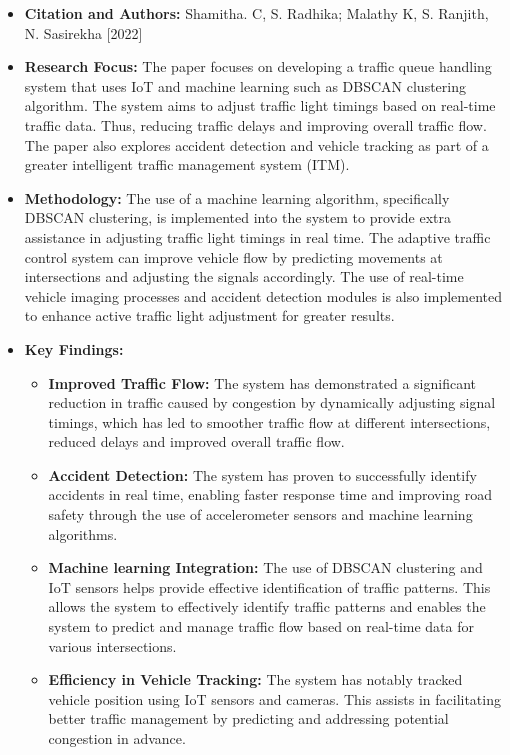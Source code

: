 \documentclass[12pt,a4paper]{article}
\begin{document}
\begin{itemize}
    \begin{itemize}
        \item \textbf{Citation and Authors:} Shamitha. C, S. Radhika; Malathy K, S. Ranjith, N. Sasirekha [2022] 
        \item \textbf{Research Focus:} The paper focuses on developing a traffic queue handling system that uses IoT and machine learning such as DBSCAN clustering algorithm. The system aims to adjust traffic light timings based on real-time traffic data. Thus, reducing traffic delays and improving overall traffic flow. The paper also explores accident detection and vehicle tracking as part of a greater intelligent traffic management system (ITM).
        \item \textbf{Methodology:} The use of a machine learning algorithm, specifically DBSCAN clustering, is implemented into the system to provide extra assistance in adjusting traffic light timings in real time. The adaptive traffic control system can improve vehicle flow by predicting movements at intersections and adjusting the signals accordingly. The use of real-time vehicle imaging processes and accident detection modules is also implemented to enhance active traffic light adjustment for greater results.
        \item \textbf{Key Findings:} 
        \begin{itemize}
            \item \textbf{Improved Traffic Flow:} The system has demonstrated a significant reduction in traffic caused by congestion by dynamically adjusting signal timings, which has led to smoother traffic flow at different intersections, reduced delays and improved overall traffic flow.
            \item \textbf{Accident Detection:} The system has proven to successfully identify accidents in real time, enabling faster response time and improving road safety through the use of accelerometer sensors and machine learning algorithms.
            \item \textbf{Machine learning Integration:} The use of DBSCAN clustering and IoT sensors helps provide effective identification of traffic patterns. This allows the system to effectively identify traffic patterns and enables the system to predict and manage traffic flow based on real-time data for various intersections. 
            \item \textbf{Efficiency in Vehicle Tracking:} The system has notably tracked vehicle position using IoT sensors and cameras. This assists in facilitating better traffic management by predicting and addressing potential congestion in advance. 
        \end{itemize}
    \end{itemize}
        \vspace{0.2cm}
        

\end{itemize}
\end{document}
